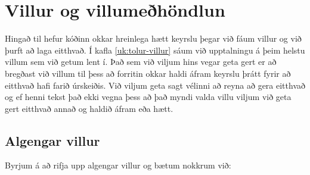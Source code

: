 
\chapter{Villur og villumeðhöndlun}\label{k:villur}
Hingað til hefur kóðinn okkar hreinlega hætt keyrslu þegar við fáum villur og við þurft að laga eitthvað.
Í kafla \ref{uk:tolur-villur} sáum við upptalningu á þeim helstu villum sem við getum lent í.
Það sem við viljum hins vegar geta gert er að bregðast við villum til þess að forritin okkar haldi áfram keyrslu þrátt fyrir að eitthvað hafi farið úrskeiðis.
Við viljum geta sagt vélinni að reyna að gera eitthvað og ef henni tekst það ekki vegna þess að það myndi valda villu viljum við geta gert eitthvað annað og haldið áfram eða hætt.

\section{Algengar villur}\label{uk:villur-algengar}
Byrjum á að rifja upp algengar villur og bætum nokkrum við:


